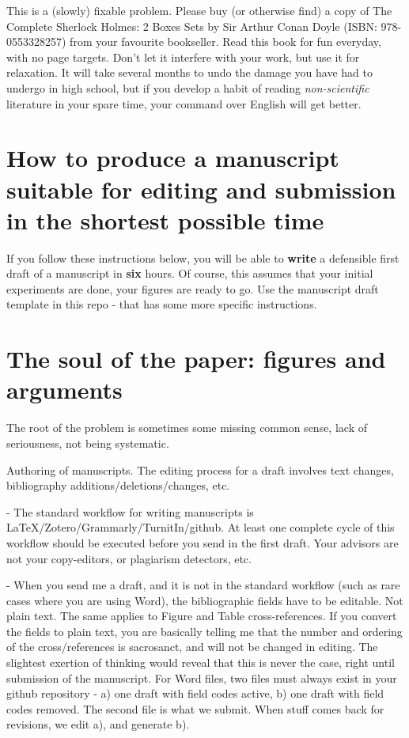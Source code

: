 \documentclass{article}
\begin{document}
This is a (slowly) fixable problem. Please buy (or otherwise find) a copy of The Complete Sherlock Holmes: 2 Boxes Sets by Sir Arthur Conan Doyle (ISBN: 978-0553328257) from your favourite bookseller. Read this book for fun everyday, with no page targets. Don't let it interfere with your work, but use it for relaxation. It will take several months to undo the damage you have had to undergo in high school, but if you develop a habit of reading \textit{non-scientific} literature in your spare time, your command over English will get better.

\section{How to produce a manuscript suitable for editing and submission in the shortest possible time}

If you follow these instructions below, you will be able to \textbf{write} a defensible first draft of a manuscript in \textbf{six} hours. Of course, this assumes that your initial experiments are done, your figures are ready to go. Use the manuscript draft template in this repo - that has some more specific instructions.



\section{The soul of the paper: figures and arguments}


The root of the problem is sometimes some missing common sense, lack of seriousness, not being systematic.

Authoring of manuscripts. The editing process for a draft involves text changes, bibliography additions/deletions/changes, etc.

- The standard workflow for writing manuscripts is LaTeX/Zotero/Grammarly/TurnitIn/github. At least one complete cycle of this workflow should be executed before you send in the first draft. Your advisors are not your copy-editors, or plagiarism detectors, etc.


- When you send me a draft, and it is not in the standard  workflow (such as rare cases where you are using Word), the bibliographic fields have to be editable. Not plain text. The same applies to Figure and Table cross-references. If you convert the fields to plain text, you are basically telling me that the number and ordering of the cross/references is sacrosanct, and will not be changed in editing. The slightest exertion of thinking would reveal that this is never the case, right until submission of the manuscript. For Word files, two files must always exist in your github repository - a) one draft with field codes active, b) one draft with field codes removed. The second file is what we submit. When stuff comes back for revisions, we edit a), and generate b).
\end{document}
